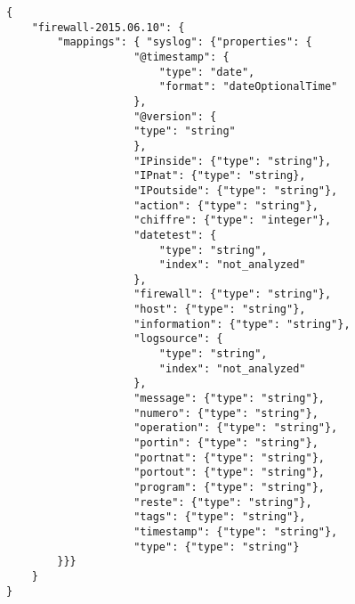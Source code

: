 \begin{lstlisting}[style=code,label={lst:mappingresult},caption={Exemple de mapping}]
{
    "firewall-2015.06.10": {
        "mappings": { "syslog": {"properties": {
                    "@timestamp": {
                        "type": "date",
                        "format": "dateOptionalTime"
                    },
                    "@version": {
                    "type": "string"
                    },
                    "IPinside": {"type": "string"},
                    "IPnat": {"type": "string},
                    "IPoutside": {"type": "string"},
                    "action": {"type": "string"},
                    "chiffre": {"type": "integer"},
                    "datetest": {
                        "type": "string",
                        "index": "not_analyzed"
                    },
                    "firewall": {"type": "string"},
                    "host": {"type": "string"},
                    "information": {"type": "string"},
                    "logsource": {
                        "type": "string",
                        "index": "not_analyzed"
                    },
                    "message": {"type": "string"},
                    "numero": {"type": "string"},
                    "operation": {"type": "string"},
                    "portin": {"type": "string"},
                    "portnat": {"type": "string"},
                    "portout": {"type": "string"},
                    "program": {"type": "string"},
                    "reste": {"type": "string"},
                    "tags": {"type": "string"},
                    "timestamp": {"type": "string"},
                    "type": {"type": "string"}
        }}}
    }
}
\end{lstlisting}
